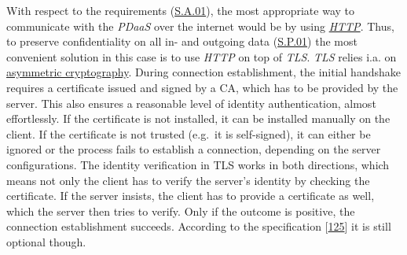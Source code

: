 \documentclass[12pt,english,a4paper,titlepage,cleardoublepage=empty,dottedtoc]{report}
\begin{document}
With respect to the requirements (\protect\hyperlink{sa01}{S.A.01}), the
most appropriate way to communicate with the \emph{PDaaS} over the
internet would be by using \emph{\protect\hyperlink{def--http}{HTTP}}.
Thus, to preserve confidentiality on all in- and outgoing data
(\protect\hyperlink{sp01}{S.P.01}) the most convenient solution in this
case is to use \emph{HTTP} on top of \emph{TLS}. \emph{TLS} relies i.a.
on \protect\hyperlink{def--asym-crypto}{asymmetric cryptography}. During
connection establishment, the initial handshake requires a certificate
issued and signed by a CA, which has to be provided by the server. This
also ensures a reasonable level of identity authentication, almost
effortlessly. If the certificate is not installed, it can be installed
manually on the client. If the certificate is not trusted (e.g.~it is
self-signed), it can either be ignored or the process fails to establish
a connection, depending on the server configurations. The identity
verification in TLS works in both directions, which means not only the
client has to verify the server's identity by checking the certificate.
If the server insists, the client has to provide a certificate as well,
which the server then tries to verify. Only if the outcome is positive,
the connection establishment succeeds. According to the specification
{[}\protect\hyperlink{ref-web_spec_tls-12_client-auth}{125}{]} it is
still optional though.
\end{document}
